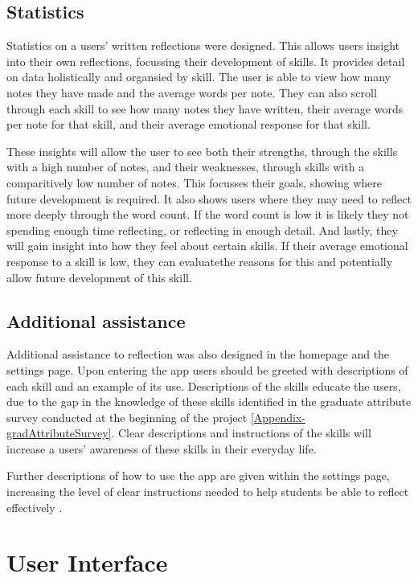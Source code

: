 \documentclass{l4proj}
\begin{document}
\subsection{Statistics}

Statistics on a users' written reflections were designed. This allows users insight into their own reflections, focussing their development of skills. It provides detail on data holistically and organsied by skill. The user is able to view how many notes they have made and the average words per note. They can also scroll through each skill to see how many notes they have written, their average words per note for that skill, and their average emotional response for that skill. 

These insights will allow the user to see both their strengths, through the skills with a high number of notes, and their weaknesses, through skills with a comparitively low number of notes. This focusses their goals, showing where future development is required. It also shows users where they may need to reflect more deeply through the word count. If the word count is low it is likely they not spending enough time reflecting, or reflecting in enough detail. And lastly, they will gain insight into how they feel about certain skills. If their average emotional response to a skill is low, they can evaluatethe reasons for this and potentially allow future development of this skill.

\subsection{Additional assistance}

Additional assistance to reflection was also designed in the homepage and the settings page. Upon entering the app users should be greeted with descriptions of each skill and an example of its use. Descriptions of the skills educate the users, due to the gap in the knowledge of these skills identified in the graduate attribute survey conducted at the beginning of the project \ref{Appendix-gradAttributeSurvey}. Clear descriptions and instructions of the skills will increase a users' awareness of these skills in their everyday life.

Further descriptions of how to use the app are given within the settings page, increasing the level of clear instructions needed to help students be able to reflect effectively \citep{bruno_reflective_2018}.

\section{User Interface}
\end{document}
